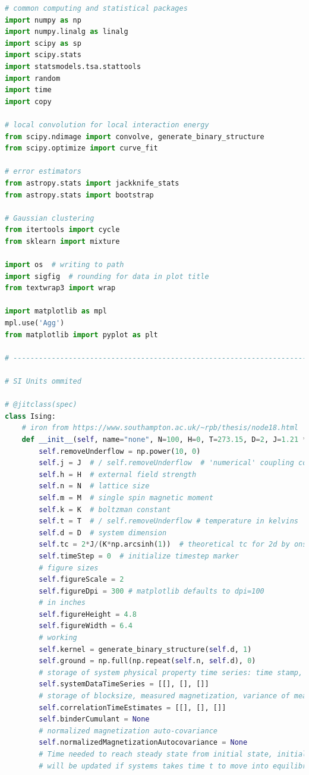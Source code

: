 \documentclass[%
showkeys,
bibnotes,
amsmath,amssymb,
floatfix,
]{revtex4-1}
\begin{document}
\begin{lstlisting}[language=Python]
# common computing and statistical packages
import numpy as np
import numpy.linalg as linalg
import scipy as sp
import scipy.stats
import statsmodels.tsa.stattools
import random
import time
import copy

# local convolution for local interaction energy
from scipy.ndimage import convolve, generate_binary_structure
from scipy.optimize import curve_fit

# error estimators
from astropy.stats import jackknife_stats
from astropy.stats import bootstrap

# Gaussian clustering
from itertools import cycle
from sklearn import mixture

import os  # writing to path
import sigfig  # rounding for data in plot title
from textwrap3 import wrap

import matplotlib as mpl
mpl.use('Agg')
from matplotlib import pyplot as plt

# -------------------------------------------------------------------------------

# SI Units ommited

# @jitclass(spec)
class Ising:
    # iron from https://www.southampton.ac.uk/~rpb/thesis/node18.html
    def __init__(self, name="none", N=100, H=0, T=273.15, D=2, J=1.21 * np.power(10.0, -21), randomFill=True, K=1.38064852 * np.power(10.0, -23), M=2.22 * np.power(10.0, (-23)), correlationTime=2, equilibriumTime=200, numberOfMeasurements=15):
        self.removeUnderflow = np.power(10, 0)
        self.j = J  # / self.removeUnderflow  # 'numerical' coupling constant
        self.h = H  # external field strength
        self.n = N  # lattice size
        self.m = M  # single spin magnetic moment
        self.k = K  # boltzman constant
        self.t = T  # / self.removeUnderflow # temperature in kelvins
        self.d = D  # system dimension
        self.tc = 2*J/(K*np.arcsinh(1))  # theoretical tc for 2d by onsanger
        self.timeStep = 0  # initialize timestep marker
        # figure sizes
        self.figureScale = 2
        self.figureDpi = 300 # matplotlib defaults to dpi=100
        # in inches
        self.figureHeight = 4.8
        self.figureWidth = 6.4
        # working
        self.kernel = generate_binary_structure(self.d, 1)
        self.ground = np.full(np.repeat(self.n, self.d), 0)
        # storage of system physical property time series: time stamp, total magnetization, total energy,
        self.systemDataTimeSeries = [[], [], []]
        # storage of blocksize, measured magnetization, variance of measured magnetization, variance in that variance
        self.correlationTimeEstimates = [[], [], []]
        self.binderCumulant = None
        # normalized magnetization auto-covariance
        self.normalizedMagnetizationAutocovariance = None
        # Time needed to reach steady state from initial state, initially set to zero
        # will be updated if systems takes time t to move into equilibrium


\end{lstlisting}
\end{document}
